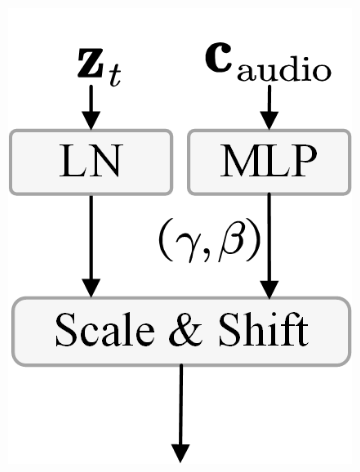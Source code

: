 \begin{figure}[t!]
\begin{minipage}[b]{0.32\textwidth}
\begin{minipage}[b]{\textwidth}
\begin{subfigure}{0.3\linewidth}
                    \includegraphics[width=\linewidth]{figs/AudioCondition/Audio_Ada.png}  
                    \caption{}  
                    \label{fig:AudioConditionAda}  
                \end{subfigure}%
                \hfill
                \begin{subfigure}{0.3\linewidth} %
                    \centering

\end{subfigure}
\end{minipage}
\end{minipage}
\end{figure}
